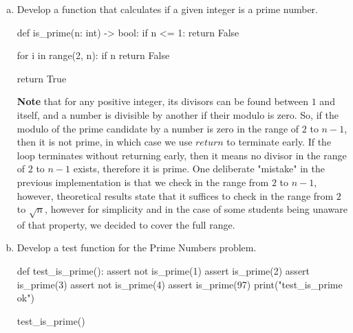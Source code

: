 \documentclass[12pt]{article}
\begin{document}
\begin{enumerate}[a)]
  \item Develop a function that calculates if a given integer is a prime number.
\begin{pythonlst}
def is_prime(n: int) -> bool:
  if n <= 1:
    return False
  
  for i in range(2, n):
    if n %
      return False
    
  return True
\end{pythonlst}
\textbf{Note} that for any positive integer, its divisors can be found between 
$1$ and itself, and a number is divisible by another if their modulo is zero. So,
if the modulo of the prime candidate by a number is zero in the range of $2$ to
$n-1$, then it is not prime, in which case we use $return$ to terminate early. 
If the loop terminates without returning early, then it means no divisor in the 
range of $2$ to $n-1$ exists, therefore it is prime. One deliberate "mistake" in
the previous implementation is that we check in the range from $2$ to $n-1$,
however, theoretical results state that it suffices to check in the range from 
$2$ to $\sqrt{n}$, however for simplicity and in the case of some students being
unaware of that property, we decided to cover the full range. 
  \item Develop a test function for the Prime Numbers problem.
\begin{pythonlst}
def test_is_prime():
  assert not is_prime(1)
  assert is_prime(2)
  assert is_prime(3)
  assert not is_prime(4)
  assert is_prime(97)
  print("test_is_prime ok")

test_is_prime()
\end{pythonlst}
\end{enumerate}
\end{document}

